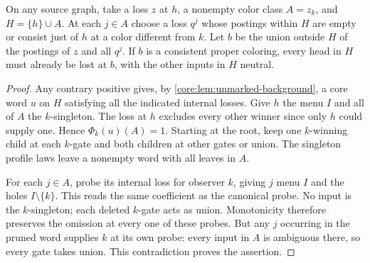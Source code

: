 \begin{lemma}
\label{core:lem:monochromatic-opposite-losses}
On any source graph, take a loss $z$ at $h$, a nonempty color class
$A=z_k$, and $H=\{h\}\cup A$. At each $j\in A$ choose a loss $q^j$
whose postings within $H$ are empty or consist just of $h$ at a color
different from $k$. Let $b$ be the union outside $H$ of the postings
of $z$ and all $q^j$. If $b$ is a consistent proper coloring, every
head in $H$ must already be lost at $b$, with the other inputs in $H$
neutral.
\end{lemma}
\begin{proof}
Any contrary positive gives, by \cref{core:lem:unmarked-background},
a core word $u$ on $H$ satisfying all the indicated internal losses.
Give $h$ the menu $I$ and all of $A$ the $k$-singleton. The loss at
$h$ excludes every other winner since only $h$ could supply one.
Hence $\Phi_k(u)(A)=1$. Starting at the root, keep one $k$-winning
child at each $k$-gate and both children at other gates or union.
The singleton profile laws leave a nonempty word with all leaves
in $A$.

For each $j\in A$, probe its internal loss for observer $k$, giving
$j$ menu $I$ and the holes $I\setminus\{k\}$. This reads the same
coefficient as the canonical probe. No input is the $k$-singleton;
each deleted $k$-gate acts as union. Monotonicity therefore preserves
the omission at every one of these probes. But any $j$ occurring in
the pruned word supplies $k$ at its own probe: every input in $A$
is ambiguous there, so every gate takes union. This contradiction
proves the assertion.
\end{proof}


